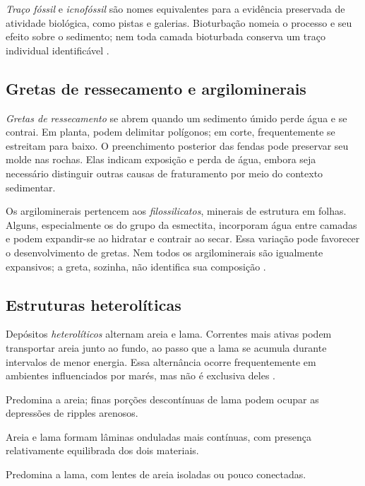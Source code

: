 \emph{Traço fóssil} e \emph{icnofóssil} são nomes equivalentes para a
evidência preservada de atividade biológica, como pistas e galerias.
Bioturbação nomeia o processo e seu efeito sobre o sedimento; nem toda
camada bioturbada conserva um traço individual identificável
\autocite{kuichnologia}.

\subsection{Gretas de ressecamento e argilominerais}

\emph{Gretas de ressecamento} se abrem quando um sedimento úmido perde
água e se contrai. Em planta, podem delimitar polígonos; em corte,
frequentemente se estreitam para baixo. O preenchimento posterior
das fendas pode preservar seu molde nas rochas. Elas indicam exposição
e perda de água, embora seja necessário distinguir outras causas de
fraturamento por meio do contexto sedimentar.

Os argilominerais pertencem aos \emph{filossilicatos}, minerais de
estrutura em folhas. Alguns, especialmente os do grupo da esmectita,
incorporam água entre camadas e podem expandir-se ao hidratar e contrair
ao secar. Essa variação pode favorecer o desenvolvimento de gretas.
Nem todos os argilominerais são igualmente expansivos; a greta, sozinha,
não identifica sua composição \autocite{usgsargilas}.

\subsection{Estruturas heterolíticas}

Depósitos \emph{heterolíticos} alternam areia e lama. Correntes mais
ativas podem transportar areia junto ao fundo, ao passo que a lama se
acumula durante intervalos de menor energia. Essa alternância ocorre
frequentemente em ambientes influenciados por marés, mas não é exclusiva
deles \autocite{kgsheterolitica}.

\begin{description}[leftmargin=3.1cm,style=nextline]
  \item[Acamamento flaser] Predomina a areia; finas porções descontínuas
  de lama podem ocupar as depressões de ripples arenosos.
  \item[Acamamento ondulado] Areia e lama formam lâminas onduladas mais
  contínuas, com presença relativamente equilibrada dos dois materiais.
  \item[Acamamento lenticular] Predomina a lama, com lentes de areia
  isoladas ou pouco conectadas.
\end{description}

